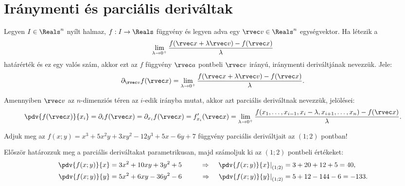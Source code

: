 \clearpage
\section{Iránymenti és parciális deriváltak}\label{sec-03-02}

\begin{definition}
  Legyen $I \in \Reals^n$ nyílt halmaz, $f: I \to \Reals$ függvény és
  legyen adva egy $\rvec v \in \Reals^n$ egységvektor. Ha létezik a
  $$
    \lim_{\lambda \to 0^+} \frac{
      f(\rvec x + \lambda \rvec v) - f(\rvec x)
    }{
      \lambda
    }
  $$
  határérték és ez egy valós szám, akkor ezt az $f$ függvény $\rvec a$
  pontbeli $\rvec v$ irányú, iránymenti deriváltjának nevezzük. Jele:
  $$
    \partial_{\rvec v} f(\rvec x) = \lim_{\lambda \to 0^+} \frac{
      f(\rvec x + \lambda \rvec v) - f(\rvec x)
    }{
      \lambda
    }
    \text.
  $$
\end{definition}

\begin{note}
  Amennyiben $\rvec v$ az $n$-dimenziós téren az $i$-edik irányba mutat,
  akkor azt parciális deriváltnak nevezzük, jelölései:
  $$
    \pdv{f(\rvec x)}{x_i}
    = \partial_i f(\rvec x)
    = \partial_{x_i} f(\rvec x)
    = f'_{x_i}(\rvec x)
    = \lim_{\lambda \to 0^+} \frac{
      f(x_1, \ldots, x_{i-1}, x_i - \lambda, x_{i+1}, \ldots, x_n) - f(\rvec x)
    }{
      \lambda
    }
    \text.
  $$
\end{note}

\begin{example}
  Adjuk meg az $f(x; y) = x^3 + 5x^2y + 3xy^2 - 12y^3 + 5x - 6y + 7$ függvény
  parciális deriváltjait az $(1;2)$ pontban!

  \hdashrule[.8ex][x]{\dimexpr\textwidth}{1pt}{2mm 3pt}

  Először határozzuk meg a parciális deriváltakat parametrikusan, majd
  számoljuk ki az $(1;2)$ pontbeli értékeket:
  \begin{alignat*}{9}
    \pdv{f(x; y)}{x}                      & = 3x^2 + 10xy + 3y^2 + 5
                                          & \qquad\Rightarrow\quad
    \left.\pdv{f(x; y)}{x}\right|_{(1;2)} & = 3 + 20 + 12 + 5 = 40
    \text,
    \\
    \pdv{f(x; y)}{y}                      & = 5x^2 + 6xy - 36y^2 - 6
                                          & \qquad\Rightarrow\quad
    \left.\pdv{f(x; y)}{y}\right|_{(1;2)} & = 5 + 12 - 144 - 6 = -133
    \text.
  \end{alignat*}
\end{example}

